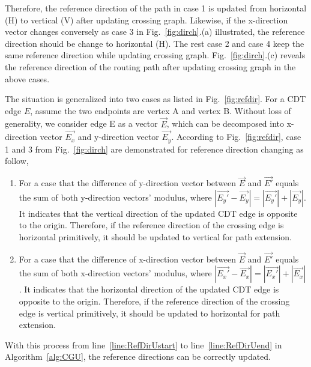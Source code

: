     Therefore, the reference direction of the path in case 1 is updated from horizontal (H) to vertical (V) after updating crossing graph. Likewise, if the x-direction vector changes conversely as case 3 in Fig.~\ref{fig:dirch}.(a) illustrated, the reference direction should be change to horizontal (H). The rest case 2 and case 4 keep the same reference direction while updating crossing graph. Fig.~\ref{fig:dirch}.(c) reveals the reference direction of the routing path after updating crossing graph in the above cases.

    The situation is generalized into two cases as listed in Fig.~\ref{fig:refdir}.
    For a CDT edge $E$, assume the two endpoints are vertex A and vertex B. Without loss of generality, we consider edge E as a vector $\overrightarrow{E}$, which can be decomposed into x-direction vector $\overrightarrow{E_x}$ and y-direction vector $\overrightarrow{E_y}$. According to Fig.~\ref{fig:refdir}, case 1 and 3 from Fig.~\ref{fig:dirch} are demonstrated for reference direction changing as follow, 

    


    \begin{enumerate}
      \item For a case that the difference of y-direction vector between $\overrightarrow{E}$ and $\overrightarrow{E'}$ equals the sum of both y-direction vectors' modulus, where $|\overrightarrow{E_y'} - \overrightarrow{E_y}|=|\overrightarrow{E_y'}|+|\overrightarrow{E_y}|$. It indicates that the vertical direction of the updated CDT edge is opposite to the origin. Therefore, if the reference direction of the crossing edge is horizontal primitively, it should be updated to vertical for path extension.
      \item For a case that the difference of x-direction vector between $\overrightarrow{E}$ and $\overrightarrow{E'}$ equals the sum of both x-direction vectors' modulus, where $|\overrightarrow{E_x'} - \overrightarrow{E_x}|=|\overrightarrow{E_x'}|+|\overrightarrow{E_x}|$. It indicates that the horizontal direction of the updated CDT edge is opposite to the origin. Therefore, if the reference direction of the crossing edge is vertical primitively, it should be updated to horizontal for path extension.
    \end{enumerate}

    

    With this process from line~\ref{line:RefDirUstart} to line~\ref{line:RefDirUend} in Algorithm~\ref{alg:CGU}, the reference directions can be correctly updated.

